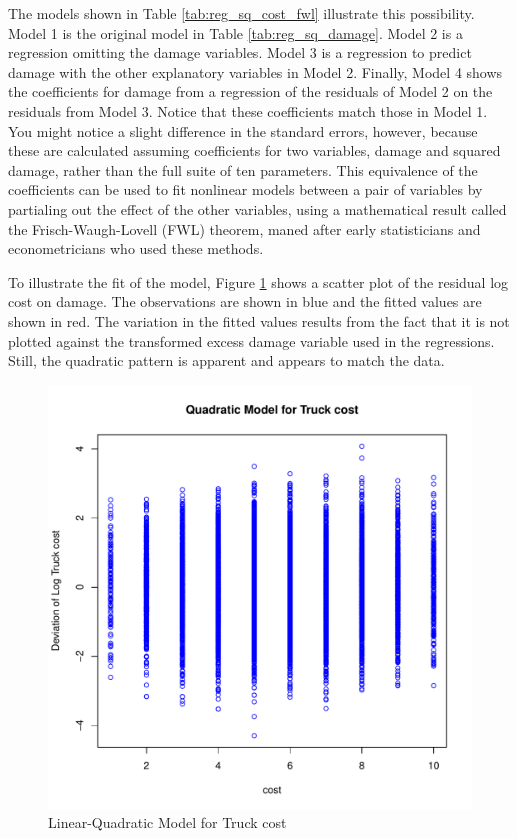 \documentclass[11pt]{paper}
\begin{document}
The models shown in
Table \ref{tab:reg_sq_cost_fwl}
illustrate this possibility. 
Model 1 is the original model in 
Table \ref{tab:reg_sq_damage}. 
Model 2 is a regression omitting the damage variables. 
Model 3 is a regression to predict damage with the other explanatory variables in Model 2.
Finally, Model 4 shows the coefficients for damage
from a regression of the residuals of Model 2
on the residuals from Model 3. 
Notice that these coefficients match those in Model 1. 
You might notice a slight difference in the standard errors, however, 
because these are calculated assuming coefficients 
for two variables, damage and squared damage,
rather than the full suite of ten parameters.
This equivalence of the coefficients can be used to fit
nonlinear models between a pair of variables by 
partialing out the effect of the other variables, 
using a mathematical result called the Frisch-Waugh-Lovell (FWL) theorem, 
maned after early statisticians and econometricians who used these methods. 



\pagebreak 
To illustrate the fit of the model, 
Figure \ref{fig:dev_vs_cost} shows a scatter plot 
of the residual log cost on damage. 
The observations are shown in blue
and the fitted values are shown in red.
The variation in the fitted values results from the 
fact that it is not plotted against the transformed excess damage variable used in the regressions.
Still, the quadratic pattern is apparent
and appears to match the data. 

\begin{figure}[h!]
  \centering
  \includegraphics[scale = 0.5, keepaspectratio=true]{../Figures/dev_vs_cost}
  \caption{Linear-Quadratic Model for Truck cost} \label{fig:dev_vs_cost}
\end{figure}
\end{document}

